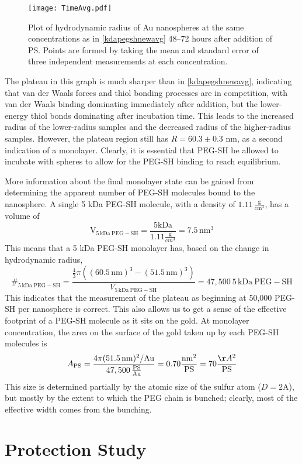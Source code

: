 \begin{figure}[htbp]
\centering
\texttt{[image: TimeAvg.pdf]}
\caption{Plot of hydrodynamic radius of Au nanospheres at the same concentrations as in \autoref{kdapegshnewavg} 48--72 hours after addition of PS. Points are formed by taking the mean and standard error of three independent measurements at each concentration.}
\label{kdapegshtime}
\end{figure}



The plateau in this graph is much sharper than in \autoref{kdapegshnewavg}, indicating that van der Waals forces and thiol bonding processes are in competition, with van der Waals binding dominating immediately after addition, but the lower-energy thiol bonds dominating after incubation time. This leads to the increased radius of the lower-radius samples and the decreased radius of the higher-radius samples. However, the plateau region still has $R=60.3\pm0.3$ nm, as a second indication of a monolayer. Clearly, it is essential that PEG-SH be allowed to incubate with spheres to allow for the PEG-SH binding to reach equilibrium.

More information about the final monolayer state can be gained from determining the apparent number of PEG-SH molecules bound to the nanosphere. A single 5 kDa PEG-SH molecule, with a density of $1.11\,\mathrm{\frac{g}{cm^3}}$, has a volume of
\[\mathrm{V_{5\,kDa\ PEG-SH}}
=\frac{5\mathrm{kDa}}{1.11\frac{\mathrm g}{\mathrm cm^3}}=7.5\mathrm{\,nm^3}\]
This means that a 5 kDa PEG-SH monolayer has, based on the change in hydrodynamic radius,
\[\#_{\mathrm{5\,kDa\ PEG-SH}}=
\frac{\frac{4}{3}\pi((60.5\mathrm{\,nm})^3-(51.5\mathrm{\,nm})^3)} {V_{\mathrm{5\,kDa\ PEG-SH}}}=47,500\mathrm{\ 5\,kDa\ PEG-SH}\]
This indicates that the measurement of the plateau as beginning at 50,000 PEG-SH per nanosphere is correct. This also allows us to get a sense of the effective footprint of a PEG-SH molecule as it sits on the gold. At monolayer concentration, the area on the surface of the gold taken up by each PEG-SH molecules is
\[A_{\mathrm{PS}}=\frac{4\pi(51.5\mathrm{\,nm})^2/\mathrm{Au}} {47,500\,\mathrm{\frac{PS}{Au}}}=0.70\frac{\mathrm{nm}^2}{\mathrm{PS}}=70\frac{\AA^2}{\mathrm{PS}}\]
This size is determined partially by the atomic size of the sulfur atom ($D=2\mathrm{A}$), but mostly by the extent to which the PEG chain is bunched; clearly, most of the effective width comes from the bunching.

\section{Protection Study}
\label{protectionstudy}

